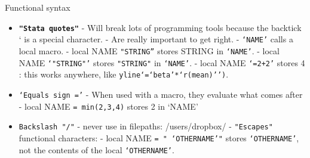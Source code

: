 \documentclass[aspectratio=169]{beamer}
\begin{document}
\begin{frame}{Functional syntax}
\begin{multicols}{2}	
	
	\begin{itemize}[<default overlay specification>]
		\item<1>  \texttt{\textbf {"Stata quotes"}}
			\newline - Will break lots of programming tools because the backtick ` is a special character.
			\newline - Are really important to get right. 
			\newline -  \texttt{`NAME’} calls a local macro.
			\newline - local NAME  \texttt{"STRING”} stores STRING in  \texttt{`NAME’}. 
			\newline - local NAME  \texttt{`"STRING"'} stores  \texttt{"STRING"} in  \texttt{`NAME’}. 
			\newline - local NAME  \texttt{`=2+2’} stores 4 : this works anywhere, like  \texttt{yline`=`beta’*`r(mean)’’)}.
		\item<1>   \texttt{`Equals sign =’}
			\newline - When used with a macro, they evaluate what comes after
			\newline - local NAME  \texttt{= min(2,3,4)} stores 2 in `NAME’
		\item<1>   \texttt{Backslash "/"}
			\newline - never use in filepaths: /users/dropbox/
			\newline -  \texttt{"Escapes"} functional characters:
			\newline - local NAME  \texttt{= "\ `OTHERNAME’"} stores  \texttt{`OTHERNAME’}, not the contents of the local  \texttt{`OTHERNAME’}.
	\end{itemize}
	
\end{multicols}
\end{frame}
\end{document}

